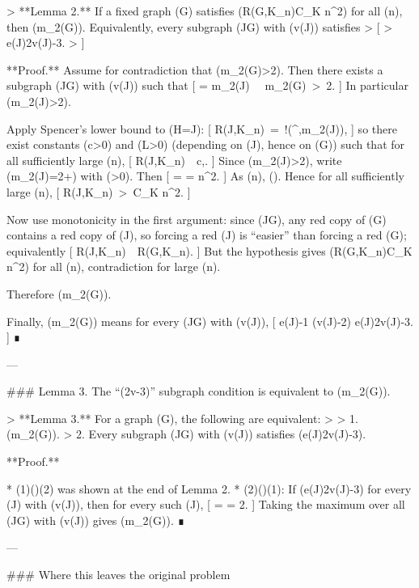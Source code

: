 > **Lemma 2.** If a fixed graph (G) satisfies (R(G,K_n)\le C_K n^2) for all (n), then (m_2(G)). Equivalently, every subgraph (J\subseteq G) with (v(J)) satisfies
> [
> e(J)\le 2v(J)-3.
> ]

**Proof.**
Assume for contradiction that (m_2(G)>2). Then there exists a subgraph (J\subseteq G) with (v(J)) such that
[
 = m_2(J) \ \ge\ m_2(G)\ >\ 2.
]
In particular (m_2(J)>2).

Apply Spencer’s lower bound to (H=J):
[
R(J,K_n)\ =\ \Omega!\big(^{,m_2(J)}\big),
]
so there exist constants (c>0) and (L>0) (depending on (J), hence on (G)) such that for all sufficiently large (n),
[
R(J,K_n)\ \ge\ c,.
]
Since (m_2(J)>2), write (m_2(J)=2+\varepsilon) with (\varepsilon>0). Then
[
 = 
= n^2\cdot {}.
]
As (n\to\infty), (\to\infty). Hence for all sufficiently large (n),
[
R(J,K_n)\ >\ C_K n^2.
]

Now use monotonicity in the first argument: since (J\subseteq G), any red copy of (G) contains a red copy of (J), so forcing a red (J) is “easier” than forcing a red (G); equivalently
[
R(J,K_n)\ \le\ R(G,K_n).
]
But the hypothesis gives (R(G,K_n)\le C_K n^2) for all (n), contradiction for large (n).

Therefore (m_2(G)).

Finally, (m_2(G)) means for every (J\subseteq G) with (v(J)),
[
\quad\Longrightarrow\quad
e(J)-1 (v(J)-2)
\quad\Longrightarrow\quad
e(J)\le 2v(J)-3.
]
∎

---

### Lemma 3. The “(2v-3)” subgraph condition is equivalent to (m_2(G)).

> **Lemma 3.** For a graph (G), the following are equivalent:
>
> 1. (m_2(G)).
> 2. Every subgraph (J\subseteq G) with (v(J)) satisfies (e(J)\le 2v(J)-3).

**Proof.**

* (1)(\Rightarrow)(2) was shown at the end of Lemma 2.
* (2)(\Rightarrow)(1): If (e(J)\le 2v(J)-3) for every (J) with (v(J)), then for every such (J),
  [
  \le {}
  =  = 2.
  ]
  Taking the maximum over all (J\subseteq G) with (v(J)) gives (m_2(G)).
  ∎

---

### Where this leaves the original problem

